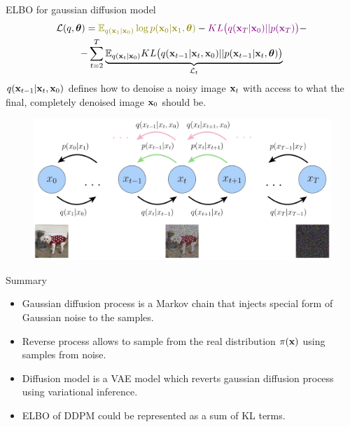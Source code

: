 \begin{frame}{ELBO for gaussian diffusion model}
	\vspace{-0.5cm}
	\begin{multline*}
		\cL(q, \btheta) =  {\color{olive}\bbE_{q(\bx_1 | \bx_0)} \log p(\bx_0 | \bx_1, \btheta)} - {\color{violet}KL\bigl(q(\bx_T | \bx_0) || p(\bx_T)\bigr)} - \\
		- \sum_{t=2}^T \underbrace{ \bbE_{q(\bx_t | \bx_0)} KL \bigl(q(\bx_{t-1} | \bx_t, \bx_0) || p(\bx_{t - 1} | \bx_t, \btheta )\bigr)}_{\cL_t}
	\end{multline*}
	$q(\mathbf{x}_{t-1} | \mathbf{x}_t, \mathbf{x}_0)$ defines how to denoise a noisy image $\mathbf{x}_t$ with access to what the final, completely denoised image $\mathbf{x}_0$ should be.
	
	\begin{figure}
		\includegraphics[width=0.85\linewidth]{figs/diffusion_objective}
	\end{figure}

\end{frame}
\begin{frame}{Summary}
	\begin{itemize}
		\item Gaussian diffusion process is a Markov chain that injects special form of Gaussian noise to the samples.
		\vfill
		\item Reverse process allows to sample from the real distribution $\pi(\mathbf{x})$ using samples from noise.
		\vfill
		\item Diffusion model is a VAE model which reverts gaussian diffusion process using variational inference.
		\vfill
		\item ELBO of DDPM could be represented as a sum of KL terms.
	\end{itemize}
\end{frame}
 